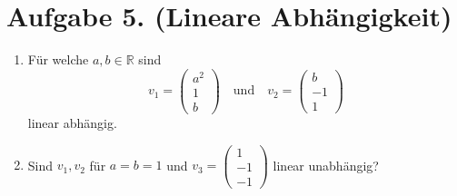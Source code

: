 \documentclass[german,12pt]{homework}
\newcommand{\RR}{\mathbb{R}}
\begin{document}
    \section*{Aufgabe 5. (Lineare Abhängigkeit)}

    \begin{problem}
        \begin{enumerate}
            \item Für welche \(a, b \in \RR\) sind
            \[v_1 = \begin{pmatrix}a^2\\1\\b\end{pmatrix} \quad \text{und} \quad v_2 = \begin{pmatrix}b\\-1\\1\end{pmatrix}\]
            linear abhängig.
            \item Sind \(v_1, v_2\) für \(a = b = 1\) und \(v_3 = \begin{pmatrix}1\\-1\\-1\end{pmatrix}\) linear unabhängig?
        \end{enumerate}
    \end{problem}
\end{document}
